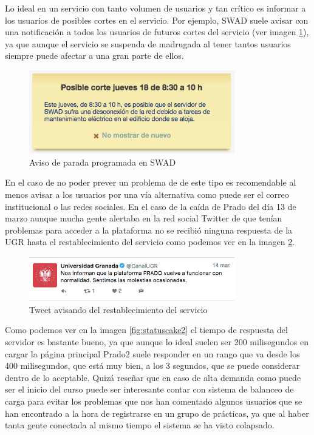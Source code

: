 \bigskip
Lo ideal en un servicio con tanto volumen de usuarios y tan crítico es informar a los usuarios de posibles cortes en el servicio. Por ejemplo, SWAD suele avisar con una notificación a todos los usuarios de futuros cortes del servicio (ver imagen \ref{fig:paroprogramadoswad}), ya que aunque el servicio se suspenda de madrugada al tener tantos usuarios siempre puede afectar a una gran parte de ellos. 

\begin{figure}[H]
\centering
\includegraphics[width=0.8\textwidth]{../images/paroprogramadoswad}
\caption{Aviso de parada programada en SWAD}
\label{fig:paroprogramadoswad}
\end{figure}

\bigskip
En el caso de no poder prever un problema de de este tipo es recomendable al menos avisar a los usuarios por una vía alternativa como puede ser el correo institucional o las redes sociales. En el caso de la caída de Prado del día 13  de marzo aunque mucha gente alertaba en la red social Twitter de que tenían problemas para acceder a la plataforma no se recibió ninguna respuesta de la UGR hasta el restablecimiento del servicio como podemos ver en la imagen \ref{fig:tweet}. 



\begin{figure}[H]
\centering
\includegraphics[width=0.8\textwidth]{../images/tweet}
\caption{Tweet avisando del restablecimiento del servicio}
\label{fig:tweet}
\end{figure}

\bigskip
Como podemos ver en la imagen \ref{fig:statuscake2} el tiempo de respuesta del servidor es bastante bueno, ya que aunque lo ideal suelen ser 200 milisegundos en cargar la página principal Prado2 suele responder en un rango que va desde los 400 milisegundos, que está muy bien, a los 3 segundos, que se puede considerar dentro de lo aceptable. Quizá reseñar que en caso de alta demanda como puede ser el inicio del curso puede ser interesante contar con sistema de balanceo de carga para evitar los problemas que nos han comentado algunos usuarios que se han encontrado a la hora de registrarse en un grupo de prácticas, ya que al haber tanta gente conectada al mismo tiempo el sistema se ha visto colapsado. 



